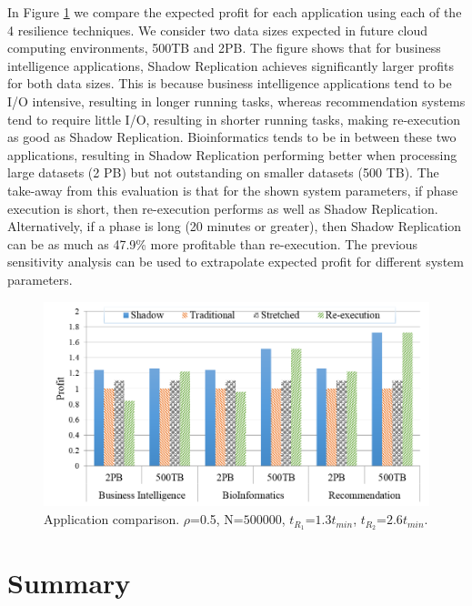 In Figure \ref{fig:app_compare} we compare the expected
profit for each application using each of the 4 resilience techniques. 
We consider two data sizes expected in future
cloud computing environments, 500TB and 2PB. The figure shows that
for business intelligence applications, Shadow Replication achieves significantly larger profits for both data sizes. This
is because business intelligence applications tend to be I/O intensive,
resulting in longer running tasks, whereas recommendation systems tend
to require little I/O, resulting in shorter running tasks, making
re-execution as good as Shadow Replication. Bioinformatics tends to be in between
these two applications, resulting in Shadow Replication performing better
when processing large datasets (2 PB) but not outstanding on smaller
datasets (500 TB). The take-away from this evaluation is that for the
shown system parameters, if phase execution is short, then re-execution
performs as well as Shadow Replication. Alternatively, if a phase is long (20 minutes or
greater), then Shadow Replication can be as much as 47.9\% more
profitable than re-execution. The previous sensitivity analysis can be
used to extrapolate expected profit for different system parameters.


\begin{figure}[!h]
	
	\begin{center}
	\includegraphics[width=\columnwidth]{Figures/application_comparison.png}
	\end{center}
	\caption{Application comparison. $\rho$=0.5, N=$500000$, $t_{R_1}$=$1.3t_{min}$, $t_{R_2}$=$2.6t_{min}$.}
	\label{fig:app_compare}
\end{figure}





\section{Summary}

